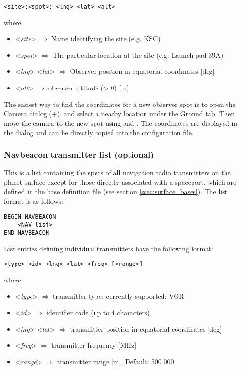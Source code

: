 \documentclass[Orbiter Developer Manual.tex]{subfiles}
\begin{document}
\begin{lstlisting}[language=OSFS]
<site>:<spot>: <lng> <lat> <alt>
\end{lstlisting}

\noindent
where

\begin{itemize}
\item <\textit{site}> $\Rightarrow$ Name identifying the site (e.g. KSC)
\item <\textit{spot}> $\Rightarrow$ The particular location at the site (e.g. Launch pad 39A)
\item <\textit{lng}> <\textit{lat}> $\Rightarrow$ Observer position in equatorial coordinates [deg]
\item <\textit{alt}> $\Rightarrow$ observer altitude (> 0) [m]
\end{itemize}

\noindent
The easiest way to find the coordinates for a new observer spot is to open the Camera dialog (\Ctrl+), and select a nearby location under the Ground tab. Then move the camera to the new spot using \Ctrl\DArrow\UArrow\RArrow\LArrow and . The coordinates are displayed in the dialog and can be directly copied into the configuration file.


\subsubsection*{Navbeacon transmitter list (optional)}
This is a list containing the specs of all navigation radio transmitters on the planet surface except for those directly associated with a spaceport, which are defined in the base definition file (see section \ref{ssec:surface_bases}). The list format is as follows:

\begin{lstlisting}[language=OSFS]
BEGIN_NAVBEACON
	<NAV list>
END_NAVBEACON
\end{lstlisting}

\noindent
List entries defining individual transmitters have the following format:

\begin{lstlisting}[language=OSFS]
<type> <id> <lng> <lat> <freq> [<range>]
\end{lstlisting}

\noindent
where

\begin{itemize}
\item <\textit{type}> $\Rightarrow$ transmitter type, currently supported: VOR
\item <\textit{id}> $\Rightarrow$ identifier code (up to 4 characters)
\item <\textit{lng}> <\textit{lat}> $\Rightarrow$ transmitter position in equatorial coordinates [deg]
\item <\textit{freq}> $\Rightarrow$ transmitter frequency [MHz]
\item <\textit{range}> $\Rightarrow$ transmitter range [m]. Default: 500 000
\end{itemize}
\end{document}
